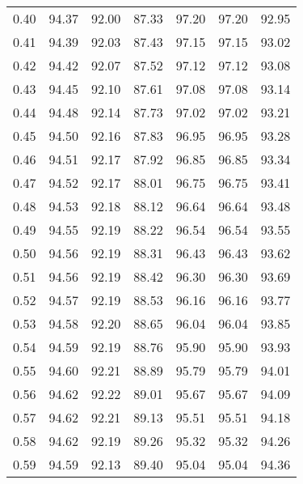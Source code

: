 \begin{tabular}{|c|c|c|c|c|c|c|}
      0.40 &     94.37 &     92.00 &      87.33 &   97.20 &      97.20 &         92.95 \\
      0.41 &     94.39 &     92.03 &      87.43 &   97.15 &      97.15 &         93.02 \\
      0.42 &     94.42 &     92.07 &      87.52 &   97.12 &      97.12 &         93.08 \\
      0.43 &     94.45 &     92.10 &      87.61 &   97.08 &      97.08 &         93.14 \\
      0.44 &     94.48 &     92.14 &      87.73 &   97.02 &      97.02 &         93.21 \\
      0.45 &     94.50 &     92.16 &      87.83 &   96.95 &      96.95 &         93.28 \\
      0.46 &     94.51 &     92.17 &      87.92 &   96.85 &      96.85 &         93.34 \\
      0.47 &     94.52 &     92.17 &      88.01 &   96.75 &      96.75 &         93.41 \\
      0.48 &     94.53 &     92.18 &      88.12 &   96.64 &      96.64 &         93.48 \\
      0.49 &     94.55 &     92.19 &      88.22 &   96.54 &      96.54 &         93.55 \\
      0.50 &     94.56 &     92.19 &      88.31 &   96.43 &      96.43 &         93.62 \\
      0.51 &     94.56 &     92.19 &      88.42 &   96.30 &      96.30 &         93.69 \\
      0.52 &     94.57 &     92.19 &      88.53 &   96.16 &      96.16 &         93.77 \\
      0.53 &     94.58 &     92.20 &      88.65 &   96.04 &      96.04 &         93.85 \\
      0.54 &     94.59 &     92.19 &      88.76 &   95.90 &      95.90 &         93.93 \\
      0.55 &     94.60 &     92.21 &      88.89 &   95.79 &      95.79 &         94.01 \\
      0.56 &     94.62 &     92.22 &      89.01 &   95.67 &      95.67 &         94.09 \\
      0.57 &     94.62 &     92.21 &      89.13 &   95.51 &      95.51 &         94.18 \\
      0.58 &     94.62 &     92.19 &      89.26 &   95.32 &      95.32 &         94.26 \\
      0.59 &     94.59 &     92.13 &      89.40 &   95.04 &      95.04 &         94.36 \\

\end{tabular}
